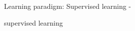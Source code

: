 %
%
%

\begin{frame}[t,allowframebreaks]{
    Learning paradigm: Supervised learning - }

\gls{supervised learning}

\end{frame}